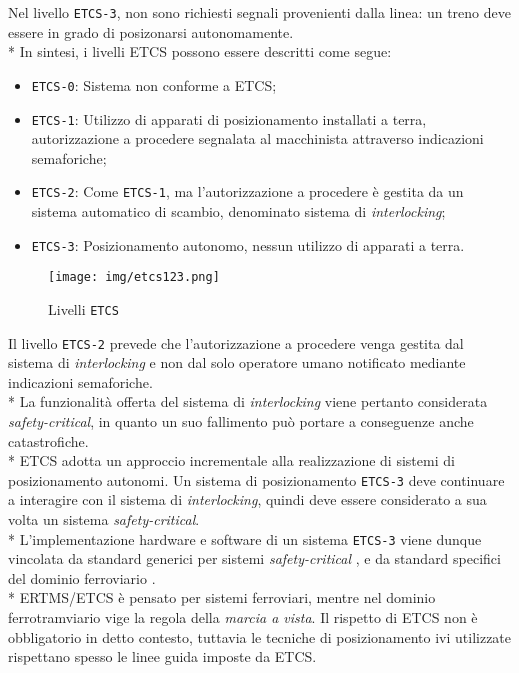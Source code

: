 Nel livello \texttt{ETCS-3}, non sono richiesti segnali provenienti dalla linea: un treno deve essere in grado di posizonarsi autonomamente. \cite{etcs3}\\*
In sintesi, i livelli ETCS possono essere descritti come segue:
\begin{itemize}
	\item \texttt{ETCS-0}: Sistema non conforme a ETCS;
	\item \texttt{ETCS-1}: Utilizzo di apparati di posizionamento installati a terra, autorizzazione a procedere segnalata al macchinista attraverso indicazioni semaforiche;
	\item \texttt{ETCS-2}: Come \texttt{ETCS-1}, ma l'autorizzazione a procedere \`e gestita da un sistema automatico di scambio, denominato sistema di \emph{interlocking};\cite{interlocking}
	\item \texttt{ETCS-3}: Posizionamento autonomo, nessun utilizzo di apparati a terra.
\end{itemize}
\begin{figure}[h]
	\centering
	\texttt{[image: img/etcs123.png]}
	\caption{Livelli \texttt{ETCS}}
	\label{fig:etcs123}
\end{figure}
Il livello \texttt{ETCS-2} prevede che l'autorizzazione a procedere venga gestita dal sistema di \emph{interlocking} e non dal solo operatore umano notificato mediante indicazioni semaforiche.\\*
La funzionalit\`a offerta del sistema di \emph{interlocking} viene pertanto considerata \emph{safety-critical}, in quanto un suo fallimento pu\`o portare a conseguenze anche catastrofiche.\cite{marocchini}\\*
ETCS adotta un approccio incrementale alla realizzazione di sistemi di posizionamento autonomi. Un sistema di posizionamento \texttt{ETCS-3} deve continuare a interagire con il sistema di \emph{interlocking}, quindi deve essere considerato a sua volta un sistema \emph{safety-critical}.\\*
L'implementazione hardware e software di un sistema \texttt{ETCS-3} viene dunque vincolata da standard generici per sistemi \emph{safety-critical} \cite{MISRA} \cite{sil}, e da standard specifici del dominio ferroviario \cite{50128}.\\*
ERTMS/ETCS \`e pensato per sistemi ferroviari, mentre nel dominio ferrotramviario vige la regola della \emph{marcia a vista}. Il rispetto di ETCS non \`e obbligatorio in detto contesto, tuttavia le tecniche di posizionamento ivi utilizzate rispettano spesso le linee guida imposte da ETCS. 
